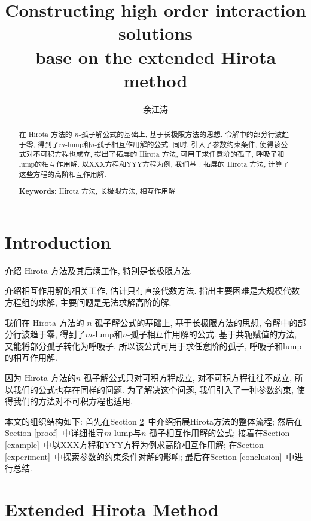 \documentclass[12pt,a4paper,UTF8]{article}
\numberwithin{equation}{section}
\newcommand{\refsec}[1]{Section \ref{#1}~}
\begin{document}
\title{Constructing high order interaction solutions \\ base on the extended Hirota method}
\author{余江涛}
\maketitle
\begin{abstract}
在 Hirota 方法的 $n$-孤子解公式的基础上, 基于长极限方法的思想, 令解中的部分行波趋于零, 得到了$m$-lump和$n$-孤子相互作用解的公式. 同时, 引入了参数约束条件, 使得该公式对不可积方程也成立, 提出了拓展的 Hirota 方法, 可用于求任意阶的孤子, 呼吸子和lump的相互作用解. 以XXX方程和YYY方程为例, 我们基于拓展的 Hirota 方法, 计算了这些方程的高阶相互作用解.

\vspace{0.2cm}

{\noindent\bf Keywords:} Hirota 方法, 长极限方法, 相互作用解
\end{abstract}

\section{Introduction}
\begin{compactitem}[\textbullet]
\item 介绍 Hirota 方法及其后续工作, 特别是长极限方法. 
\item 介绍相互作用解的相关工作, 估计只有直接代数方法. 指出主要困难是大规模代数方程组的求解, 主要问题是无法求解高阶的解.
\item 我们在 Hirota 方法的 $n$-孤子解公式的基础上, 基于长极限方法的思想, 令解中的部分行波趋于零, 得到了$m$-lump和$n$-孤子相互作用解的公式. 基于共轭赋值的方法, 又能将部分孤子转化为呼吸子, 所以该公式可用于求任意阶的孤子, 呼吸子和lump的相互作用解.
\item 因为 Hirota 方法的$n$-孤子解公式只对可积方程成立, 对不可积方程往往不成立, 所以我们的公式也存在同样的问题. 为了解决这个问题, 我们引入了一种参数约束, 使得我们的方法对不可积方程也适用. 
\end{compactitem}

本文的组织结构如下: 首先在\refsec{method}中介绍拓展Hirota方法的整体流程; 然后在\refsec{proof}中详细推导$m$-lump与$n$-孤子相互作用解的公式; 接着在\refsec{example}中以XXX方程和YYY方程为例求高阶相互作用解; 在\refsec{experiment}中探索参数的约束条件对解的影响; 最后在\refsec{conclusion}中进行总结. 

\section{Extended Hirota Method}\label{method}
\end{document}
